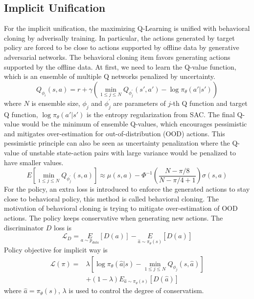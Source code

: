 \documentclass[nohyperref]{article}
\theoremstyle{plain}
\theoremstyle{definition}
\theoremstyle{remark}
\begin{document}
\subsection{Implicit Unification}
For the implicit unification, the maximizing Q-Learning is unified with behavioral cloning by adverisally training. In particular, the actions generated by target policy are forced to be close to actions supported by offline data by generative adversarial networks\cite{gan}.  The behavioral cloning item favors generating actions supported by the offline data. At first, we need to learn the Q-value function, which is an ensemble of multiple Q networks penalized by uncertainty.
\begin{equation}
\label{bellman}
Q_{\phi_i}(s,a) =r+\gamma( \underset{1\le j\le N}{\min}Q_{\phi _{j}^{'}}(s',a') -\log \pi _{\theta}( a'|s' )) 
\end{equation}
where $N$ is ensemble size, $\phi _{j}$ and ${\phi _{j}^{'}}$ are parameters of $j$-th Q function and target Q function, $\log \pi _{\theta}( a'|s')$ is the entropy regularization from SAC\cite{sac}. 
The final Q-value would be the minimum of ensemble Q-values, which encourages pessimistic and mitigates over-estimation  for out-of-distribution (OOD) actions. This pessimistic principle can also be seen as uncertainty penalization\cite{edac} where the Q-value of unstable state-action pairs with large variance would be penalized to have smaller values. 
\begin{equation}
\label{pessimism}
E[\underset{1\le j\le N}{\min}Q_{\phi_{j}^{'}}(s,a)] \approx \mu(s,a) -\varPhi ^{-1}( \frac{N-\pi /8}{N-\pi /4+1}) \sigma(s,a) 
\end{equation}
For the policy, an extra loss is introduced to enforce the generated actions to stay close to behavioral policy, this method is called behavioral cloning. The motivation of behavioral cloning is trying to mitigate over-estimation of OOD actions. The policy keeps conservative when generating new actions. The discriminator $D$ loss is
\begin{equation}
\label{gan_d_loss}
\mathcal{L}_{D}=\underset{a \sim p_{data}}{E}[ D(a)] -\underset{\hat{a} \sim \pi _{\theta}(s)}{E}[ D(\hat{a})]
\end{equation}
Policy objective for implicit way is 
\begin{equation}
\begin{aligned}
\label{policy_loss_gan}
\mathcal{L(\pi)}=& \lambda \left[\log \pi_{\theta}(\hat{a}|s) -\underset{1\le j\le N}{\min}Q_{\phi _j}( s,\hat{a}) \right] \\
                 &+ (1-\lambda)E_{\hat{a}\sim \pi_{\theta}( s)}[D(\hat{a})] 
\end{aligned}
\end{equation}
where $\hat{a}=\pi_{\theta}(s)$, $\lambda$ is used to control the degree of conservatism. 
\end{document}
